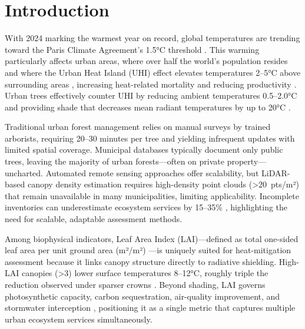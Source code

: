 \section{Introduction}

With 2024 marking the warmest year on record, global temperatures are trending toward the Paris Climate Agreement's 1.5°C threshold \cite{worldmeteorologicalorganizationWMOConfirms20242025,unitednationsParisAgreement2016}. This warming particularly affects urban areas, where over half the world's population resides \cite{unitednationsWorldUrbanization2018} and where the Urban Heat Island (UHI) effect elevates temperatures 2--5°C above surrounding areas \cite{okeUrbanClimates2017a,mohajeraniUrbanHeatIsland2017a}, increasing heat-related mortality \cite{heavisideUrbanHeatIsland2017a,watts2018ReportLancet2018} and reducing productivity \cite{kjellstromHeatHumanPerformance2016}. Urban trees effectively counter UHI by reducing ambient temperatures 0.5--2.0°C \cite{rahmanTraitsTreesCooling2020a,liCoolingEfficacyTrees2024} and providing shade that decreases mean radiant temperatures by up to 20°C \cite{duFieldAssessmentNeighboring2020,middelImpactShadeOutdoor2016}.

Traditional urban forest management relies on manual surveys by trained arborists, requiring 20--30 minutes per tree \cite{nielsenReviewUrbanTree2014} and yielding infrequent updates with limited spatial coverage. Municipal databases typically document only public trees, leaving the majority of urban forests---often on private property---uncharted. Automated remote sensing approaches offer scalability, but LiDAR-based canopy density estimation requires high-density point clouds (>20~pts/m²) that remain unavailable in many municipalities, limiting applicability. Incomplete inventories can underestimate ecosystem services by 15--35\% \cite{nowakUSUrbanForest2018a,thomasTreesOutsideForests2021}, highlighting the need for scalable, adaptable assessment methods.

Among biophysical indicators, Leaf Area Index (LAI)---defined as total one-sided leaf area per unit ground area (m²/m²) \cite{chenDefiningLeafArea1992}---is uniquely suited for heat-mitigation assessment because it links canopy structure directly to radiative shielding. High-LAI canopies (>3) lower surface temperatures 8--12°C, roughly triple the reduction observed under sparser crowns \cite{shashua-barMicroclimateModellingStreet2010}. Beyond shading, LAI governs photosynthetic capacity, carbon sequestration, air-quality improvement, and stormwater interception \cite{reichKeyCanopyTraits2012,nowakTreeForestEffects2014,threlfallApproachesUrbanVegetation2016}, positioning it as a single metric that captures multiple urban ecosystem services simultaneously.

